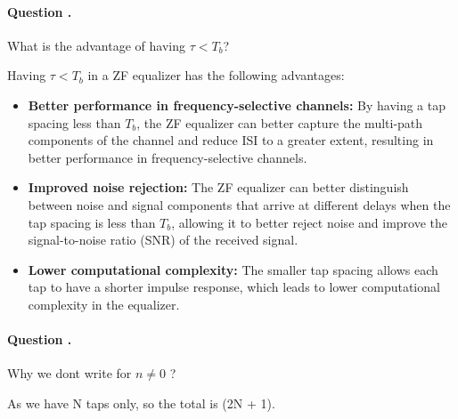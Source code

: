 \documentclass[14pt,a4paper]{report}
\newcounter{question}
\newcommand*\question{%
\stepcounter{question}%
\paragraph{Question \thesection.\thequestion}}
\begin{document}
\question
{
    What is the advantage of having $\tau < T_b$?
}
\begin{answer_box*}
    Having $\tau < T_b$ in a ZF equalizer has the following advantages:

\begin{itemize}
    \item {\textbf{Better performance in frequency-selective channels:}} By having a tap spacing less than $T_b$, the ZF equalizer can better capture the multi-path components of the channel and reduce ISI to a greater extent, resulting in better performance in frequency-selective channels.
    \item {\textbf{Improved noise rejection:}} The ZF equalizer can better distinguish between noise and signal components that arrive at different delays when the tap spacing is less than $T_b$, allowing it to better reject noise and improve the signal-to-noise ratio (SNR) of the received signal.
    \item {\textbf{Lower computational complexity:}} The smaller tap spacing allows each tap to have a shorter impulse response, which leads to lower computational complexity in the equalizer.
\end{itemize}
\end{answer_box*}

\question
{
    Why we dont write for $n \neq 0$ ?
}
\begin{answer_box*}
    As we have N taps only, so the total is (2N + 1).
\end{answer_box*}
\end{document}
